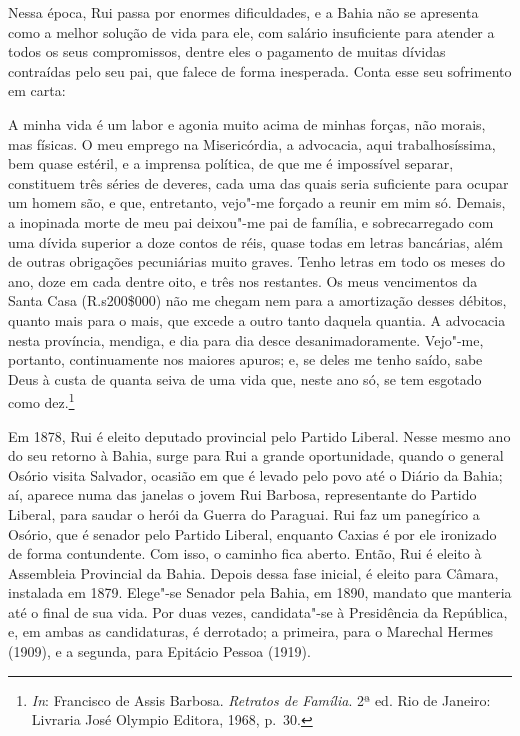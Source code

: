 Nessa época, Rui passa por enormes dificuldades, e a Bahia não se
apresenta como a melhor solução de vida para ele, com salário
insuficiente para atender a todos os seus compromissos, dentre eles o
pagamento de muitas dívidas contraídas pelo seu pai, que falece de
forma inesperada. Conta esse seu sofrimento em carta: 

\begin{hedraquote}
A minha vida é um labor e agonia muito acima de minhas forças, não
morais, mas físicas. O meu emprego na Misericórdia, a advocacia, aqui
trabalhosíssima, bem quase estéril, e a imprensa política, de que me é
impossível separar, constituem três séries de deveres, cada uma das
quais seria suficiente para ocupar um homem são, e que, entretanto,
vejo"-me forçado a reunir em mim só. Demais, a inopinada morte de meu
pai deixou"-me pai de família, e sobrecarregado com uma dívida superior
a doze contos de réis, quase todas em letras bancárias, além de outras
obrigações pecuniárias muito graves. Tenho letras em todo os meses do
ano, doze em cada dentre oito, e três nos restantes. Os meus
vencimentos da Santa Casa (R.s200\$000) não me chegam nem para a
amortização desses débitos, quanto mais para o mais, que excede a outro
tanto daquela quantia. A advocacia nesta província, mendiga, e dia para
dia desce desanimadoramente. Vejo"-me, portanto, continuamente nos
maiores apuros; e, se deles me tenho saído, sabe Deus à custa de quanta
seiva de uma vida que, neste ano só, se tem esgotado como dez.\footnote{ \textit{In}: 
Francisco de Assis Barbosa. \textit{Retratos de Família}. 2ª ed. Rio de 
Janeiro: Livraria José Olympio Editora, 1968, p.~30.}
\end{hedraquote}

Em 1878, Rui é eleito deputado provincial pelo Partido Liberal. Nesse
mesmo ano do seu retorno à Bahia, surge para Rui a grande oportunidade,
quando o general Osório visita Salvador, ocasião em que é levado pelo
povo até o Diário da Bahia; aí, aparece numa das janelas o jovem Rui
Barbosa, representante do Partido Liberal, para saudar o herói da
Guerra do Paraguai. Rui faz um panegírico a Osório, que é senador pelo
Partido Liberal, enquanto Caxias é por ele ironizado de forma
contundente. Com isso, o caminho fica aberto. Então, Rui é eleito à
Assembleia Provincial da Bahia. Depois dessa fase inicial, é eleito
para Câmara, instalada em 1879. Elege"-se Senador pela Bahia, em 1890,
mandato que manteria até o final de sua vida. Por duas vezes,
candidata"-se à Presidência da República, e, em ambas as candidaturas, é
derrotado; a primeira, para o Marechal Hermes (1909), e a segunda, para
Epitácio Pessoa (1919).


